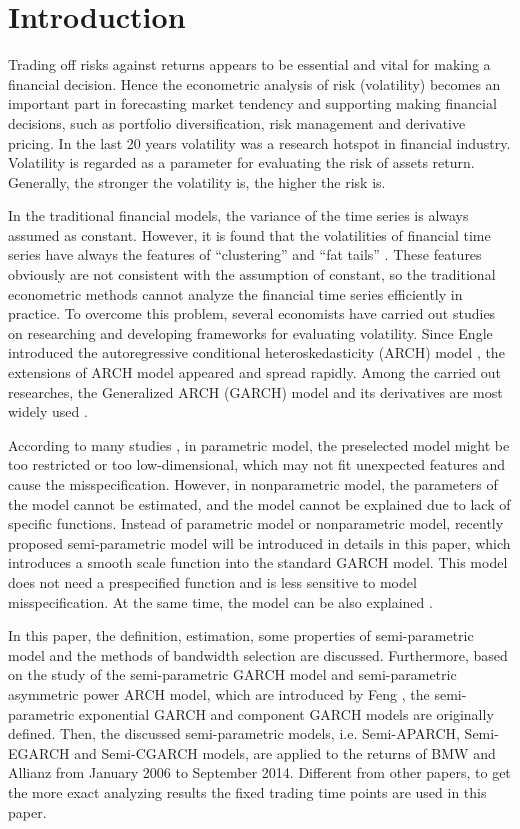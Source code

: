 \chapter{Introduction}\label{secIntroduction}
Trading off risks against returns appears to be essential and vital for making a financial decision. Hence the econometric analysis of risk (volatility) becomes an important part in forecasting market tendency and supporting making financial decisions, such as portfolio diversification, risk management and derivative pricing. In the last 20 years volatility was a research hotspot in financial industry. Volatility is regarded as a parameter for evaluating the risk of assets return. Generally, the stronger the volatility is, the higher the risk is.

In the traditional financial models, the variance of the time series is always assumed as constant. However, it is found that the volatilities of financial time series have always the features of ``clustering'' and ``fat tails''  \citep{Mandelbrot1963,EugeneF.Fama1965}. These features obviously are not consistent with the assumption of constant, so the traditional econometric methods cannot analyze the financial time series efficiently in practice. To overcome this problem, several economists have carried out studies on researching and developing frameworks for evaluating volatility. Since Engle introduced the autoregressive conditional heteroskedasticity (ARCH) model \citep{Engle1982}, the extensions of ARCH model appeared and spread rapidly. Among the carried out researches, the Generalized ARCH (GARCH) model and its derivatives are most widely used \citep{Bollerslev1986}.

 According to many studies \citep{Gourieroux1992,Eubank1993}, in parametric model, the preselected model might be too restricted or too low-dimensional, which may not fit unexpected features and cause the misspecification. However, in nonparametric model, the parameters of the model cannot be estimated, and the model cannot be explained due to lack of specific functions. Instead of parametric model or nonparametric model, recently proposed semi-parametric model will be introduced in details in this paper, which introduces a smooth scale function into the standard GARCH model. This model does not need a prespecified function and is less sensitive to model misspecification. At the same time, the model can be also explained \citep{Di2011}.

In this paper, the definition, estimation, some properties of semi-parametric model and the methods of bandwidth selection are discussed. Furthermore, based on the study of the semi-parametric GARCH model and semi-parametric asymmetric power ARCH model, which are introduced by Feng \citep{Feng2004,FengYuanhua;Sun2013}, the semi-parametric exponential GARCH and component GARCH models are originally defined. Then, the discussed semi-parametric models, i.e. Semi-APARCH, Semi-EGARCH and Semi-CGARCH models, are applied to the returns of BMW and Allianz from January 2006 to September 2014. Different from other papers, to get the more exact analyzing results the fixed trading time points are used in this paper.

